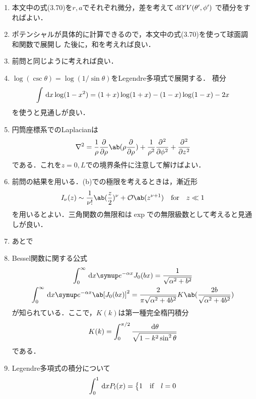 \begin{enumerate}[label={\large 3.\arabic*}]
\begin{enumerate}[(a)]
    \end{enumerate}%
  \item 本文中の式(3.70)を$r,a$でそれぞれ微分，差を考えて$\dl{\Omega'} V(\theta',\phi')$
    で積分をすればよい．
  \item ポテンシャルが具体的に計算できるので，本文中の式(3.70)を使って球面調和関数で展開し
    た後に，和を考えれば良い．
  \item 前問と同じように考えれば良い．
  \item $\log(\csc\theta) = \log(1/\sin\theta)$をLegendre多項式で展開する．
    積分
    \begin{gather}%
      \int \dl{x} \log(1-x^2) = (1+x)\log(1+x) - (1-x)\log(1-x) - 2x
    \end{gather}%
    を使うと見通しが良い．
  \item 円筒座標系でのLaplacianは
    \begin{gather}%
      \gr^2 = \frac{1}{\rho}\diffp**{\rho}{\ab(\rho\diffp{}{\rho})} + \frac{1}{\rho^2} \diffp[2]{}{\phi} + \diffp[2]{}{z}
    \end{gather}%
    である．これを$z=0,L$での境界条件に注意して解けばよい．
  \item 前問の結果を用いる．(b)での極限を考えるときは，漸近形
    \begin{gather}%
      I_\nu(z) \sim \frac{1}{\nu !}\ab(\frac{z}{2})^\nu + \order{z^{\nu+1}} \qqtext{for} z \ll 1
    \end{gather}%
    を用いるとよい．三角関数の無限和は$\exp$での無限級数として考えると見通しが良い．
  \item あとで
  \item Bessel関数に関する公式
    \begin{gather}%
      \int_0^\infty \dl{x} \e^{-\alpha x} J_0(bx) = \frac{1}{\sqrt{\alpha^2 + b^2}}\\
      \int_0^\infty \dl{x} \e^{-\alpha x} \ab[J_0(bx)]^2 = \frac{2}{\pi \sqrt{\alpha^2 + 4b^2}} 
      K\ab(\frac{2b}{\sqrt{\alpha^2 + 4b^2}})
    \end{gather}%
    が知られている．ここで，$K(k)$は第一種完全楕円積分
    \begin{gather}%
      K(k) = \int_0^{\pi/2} \frac{\dl{\theta}}{\sqrt{1-k^2\sin^2\theta}}
    \end{gather}%
    である．
  \item Legendre多項式の積分について
    \begin{gather}%
      \int_0^1 \dl{x} P_l(x) =
      \begin{dcases}%
        1 \qqtext{if} l = 0\\

\end{dcases}
\end{gather}
\end{enumerate}
